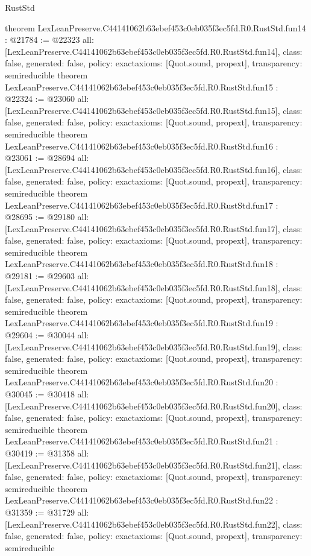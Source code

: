 \begin{lexlean}{RustStd}
\begin{coremodule}
{}
theorem LexLeanPreserve.C44141062b63ebef453c0eb035f3ec5fd.R0.RustStd.fun14 : @21784 := @22323 {
  all: [LexLeanPreserve.C44141062b63ebef453c0eb035f3ec5fd.R0.RustStd.fun14],
  class: false,
  generated: false,
  policy: exact{axioms: [Quot.sound, propext]},
  transparency: semireducible
}
theorem LexLeanPreserve.C44141062b63ebef453c0eb035f3ec5fd.R0.RustStd.fun15 : @22324 := @23060 {
  all: [LexLeanPreserve.C44141062b63ebef453c0eb035f3ec5fd.R0.RustStd.fun15],
  class: false,
  generated: false,
  policy: exact{axioms: [Quot.sound, propext]},
  transparency: semireducible
}
theorem LexLeanPreserve.C44141062b63ebef453c0eb035f3ec5fd.R0.RustStd.fun16 : @23061 := @28694 {
  all: [LexLeanPreserve.C44141062b63ebef453c0eb035f3ec5fd.R0.RustStd.fun16],
  class: false,
  generated: false,
  policy: exact{axioms: [Quot.sound, propext]},
  transparency: semireducible
}
theorem LexLeanPreserve.C44141062b63ebef453c0eb035f3ec5fd.R0.RustStd.fun17 : @28695 := @29180 {
  all: [LexLeanPreserve.C44141062b63ebef453c0eb035f3ec5fd.R0.RustStd.fun17],
  class: false,
  generated: false,
  policy: exact{axioms: [Quot.sound, propext]},
  transparency: semireducible
}
theorem LexLeanPreserve.C44141062b63ebef453c0eb035f3ec5fd.R0.RustStd.fun18 : @29181 := @29603 {
  all: [LexLeanPreserve.C44141062b63ebef453c0eb035f3ec5fd.R0.RustStd.fun18],
  class: false,
  generated: false,
  policy: exact{axioms: [Quot.sound, propext]},
  transparency: semireducible
}
theorem LexLeanPreserve.C44141062b63ebef453c0eb035f3ec5fd.R0.RustStd.fun19 : @29604 := @30044 {
  all: [LexLeanPreserve.C44141062b63ebef453c0eb035f3ec5fd.R0.RustStd.fun19],
  class: false,
  generated: false,
  policy: exact{axioms: [Quot.sound, propext]},
  transparency: semireducible
}
theorem LexLeanPreserve.C44141062b63ebef453c0eb035f3ec5fd.R0.RustStd.fun20 : @30045 := @30418 {
  all: [LexLeanPreserve.C44141062b63ebef453c0eb035f3ec5fd.R0.RustStd.fun20],
  class: false,
  generated: false,
  policy: exact{axioms: [Quot.sound, propext]},
  transparency: semireducible
}
theorem LexLeanPreserve.C44141062b63ebef453c0eb035f3ec5fd.R0.RustStd.fun21 : @30419 := @31358 {
  all: [LexLeanPreserve.C44141062b63ebef453c0eb035f3ec5fd.R0.RustStd.fun21],
  class: false,
  generated: false,
  policy: exact{axioms: [Quot.sound, propext]},
  transparency: semireducible
}
theorem LexLeanPreserve.C44141062b63ebef453c0eb035f3ec5fd.R0.RustStd.fun22 : @31359 := @31729 {
  all: [LexLeanPreserve.C44141062b63ebef453c0eb035f3ec5fd.R0.RustStd.fun22],
  class: false,
  generated: false,
  policy: exact{axioms: [Quot.sound, propext]},
  transparency: semireducible
}
\end{coremodule}
\end{lexlean}
